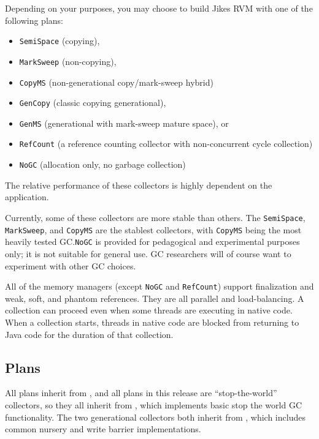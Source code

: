 Depending on your purposes, you may choose to build Jikes RVM with one
of the following plans:
\begin{itemize}
\item \texttt{SemiSpace} (copying),
\item \texttt{MarkSweep} (non-copying),
\item \texttt{CopyMS} (non-generational copy/mark-sweep hybrid)
\item \texttt{GenCopy} (classic copying generational),
\item \texttt{GenMS} (generational with mark-sweep mature space), or
\item \texttt{RefCount} (a reference counting collector with non-concurrent cycle collection)
\item \texttt{NoGC} (allocation only, no garbage collection)
\end{itemize}
The relative performance of these collectors is highly dependent on
the application. 


Currently, some of these collectors are more stable than others. 
The \texttt{SemiSpace}, \texttt{MarkSweep}, and \texttt{CopyMS} 
are the stablest collectors, with \texttt{CopyMS} being the
most heavily tested GC.\@  \texttt{NoGC} is provided for pedagogical and
experimental purposes only; it is not suitable for general use.
GC researchers will of course want to experiment with other GC choices.

All of the memory managers (except \texttt{NoGC} and \texttt{RefCount}) 
support finalization and weak, soft, and phantom references.  They are all parallel 
and load-balancing.  A collection can proceed even when some threads are
executing in native code. When a collection starts, threads in native
code are blocked from returning to Java code for the duration of that
collection.

\subsection{Plans}%
        \label{sssec:plans}%

%
All plans inherit from ,
and all plans in this release are ``stop-the-world'' collectors, so
they all inherit from
%
, which implements
basic stop the world GC functionality.  The two generational
collectors both inherit from
%
, which includes
common nursery and write barrier implementations.

